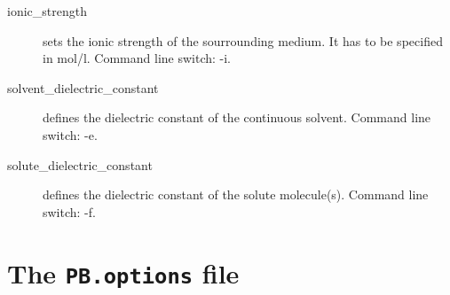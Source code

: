 \documentclass[12pt,twoside,a4paper]{article}
\begin{document}
\begin{description}
\item[ionic\_strength] sets the ionic strength of the sourrounding medium.
	It has to be specified in mol/l. Command line switch: -i.
\item[solvent\_dielectric\_constant] defines the dielectric constant of the
	continuous solvent. Command line switch: -e.
\item[solute\_dielectric\_constant] defines the dielectric constant of the
	solute molecule(s). Command line switch: -f.
\end{description}


\newpage
\appendix

\section{The {\tt PB.options} file}
\end{document}
